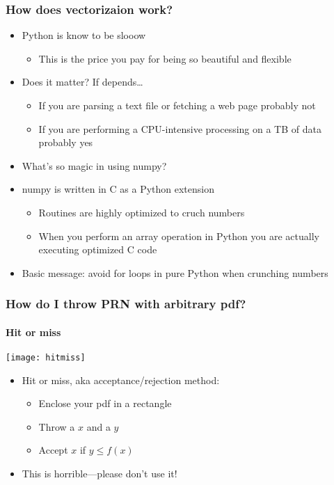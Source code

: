 \documentclass[9pt]{beamer}
\begin{document}
\begin{frame}
  \frametitle{How does vectorizaion work?}
  \begin{itemize}
  \item Python is know to be slooow
    \begin{itemize}
    \item This is the price you pay for being so beautiful and flexible
    \end{itemize}
  \item Does it matter? If depends\ldots
    \begin{itemize}
    \item If you are parsing a text file or fetching a web page probably not
    \item If you are performing a CPU-intensive processing on a TB of data
      probably yes
    \end{itemize}
  \item What's so magic in using numpy?
  \item numpy is written in C as a Python extension
    \begin{itemize}
    \item Routines are highly optimized to cruch numbers
    \item When you perform an array operation in Python you are actually
      executing optimized C code
    \end{itemize}
  \item \alert{Basic message: avoid for loops in pure Python when
    crunching numbers}
  \end{itemize}
\end{frame}


\begin{frame}
  \frametitle{How do I throw PRN with arbitrary pdf?}
  \framesubtitle{Hit or miss}
  \centering\texttt{[image: hitmiss]}

  \begin{itemize}
  \item Hit or miss, aka acceptance/rejection method:
    \begin{itemize}
    \item Enclose your pdf in a rectangle
    \item Throw a $x$ and a $y$
    \item Accept $x$ if $y \leq f(x)$
    \end{itemize}
  \item \alert{This is horrible---please don't use it!}
  \end{itemize}
\end{frame}
\end{document}
